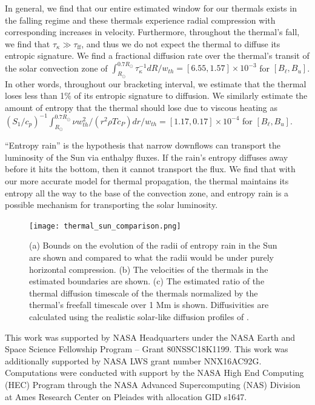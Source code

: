 \documentclass[twocolumn, amsmath, amsfonts, amssymb, trackchanges]{aastex62}
\begin{document}
In general, we find that our entire estimated window for our thermals exists in the falling regime and these thermals experience radial compression with corresponding increases in velocity.
Furthermore, throughout the thermal's fall, we find that $\tau_\kappa \gg \tau_{\text{ff}}$, and thus we do not expect the thermal to diffuse its entropic signature.
We find a fractional diffusion rate over the thermal's transit of the solar convection zone of $\int_{R_\odot}^{0.7 R_\odot} \tau_\kappa^{-1} dR/w_{th} = [6.55, 1.57]\times 10^{-3}$ for $[B_\ell, B_u]$.
In other words, throughout our bracketing interval, we estimate that the thermal loses less than 1\% of its entropic signature to diffusion.
We similarly estimate the amount of entropy that the thermal should lose due to viscous heating as $(S_1/c_p)^{-1}\int_{R_\odot}^{0.7 R_\odot} \nu w_{th}^2 / (r^2 \rho T c_P) dr / w_{th} = [1.17, 0.17] \times 10^{-4}$ for $[B_\ell, B_u]$.

``Entropy rain'' is the hypothesis that narrow downflows can transport the luminosity of the Sun via enthalpy fluxes.
If the rain's entropy diffuses away before it hits the bottom, then it cannot transport the flux.
We find that with our more accurate model for thermal propagation, the thermal maintains its entropy all the way to the base of the convection zone, and entropy rain is a possible mechanism for transporting the solar luminosity.

\begin{figure}[t!]
    \texttt{[image: thermal\_sun\_comparison.png]}
    \caption{
	(a) Bounds on the evolution of the radii of entropy rain in the Sun are shown and compared to what the radii would be under purely horizontal compression.
	(b) The velocities of the thermals in the estimated boundaries are shown. 
	(c) The estimated ratio of the thermal diffusion timescale of the thermals normalized by the thermal's freefall timescale over 1 Mm is shown.
	Diffusivities are calculated using the realistic solar-like diffusion profiles of \citet{brown2011}.
    \label{fig:thermal_sun_comparison} }
\end{figure}



\begin{acknowledgements}
This work was supported by NASA Headquarters under the NASA Earth and Space Science Fellowship Program -- Grant 80NSSC18K1199.
This work was additionally supported by  NASA LWS grant number NNX16AC92G.  
Computations were conducted with support by the NASA High End Computing (HEC) Program through the NASA  Advanced Supercomputing (NAS) Division at Ames Research Center on Pleiades with allocation GID s1647.
\end{acknowledgements}
\end{document}
